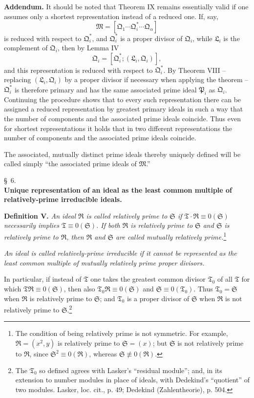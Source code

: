 \documentclass[11pt]{article}
\providecommand{\ideal}[1]{\mathfrak{#1}}
\begin{document}
\textbf{Addendum.} It should be noted that Theorem IX remains essentially valid if one assumes only a shortest representation instead of a reduced one. If, say,
\[
 \ideal M=[\ideal Q_1\cdots\ideal Q_i^*\cdots\ideal Q_\alpha]
\]
is reduced with respect to $\ideal Q_i^*$, and $\ideal Q_i^*$ is a proper divisor of $\ideal Q_i$, while $\ideal L_i$ is the complement of $\ideal Q_i$, then by Lemma IV
\[
 \ideal Q_i=[\ideal Q_i^*;(\ideal L_i,\ideal Q_i)],
\]
and this representation is reduced with respect to $\ideal Q_i^*$. By Theorem VIII -- replacing $(\ideal L_i,\ideal Q_i)$ by a proper divisor if necessary when applying the theorem -- $\ideal Q_i^*$ is therefore primary and has the same associated prime ideal $\ideal P_i$ as $\ideal Q_i$. Continuing the procedure shows that to every such representation there can be assigned a reduced representation by greatest primary ideals in such a way that the number of components and the associated prime ideals coincide. Thus even for shortest representations it holds that in two different representations the number of components and the associated prime ideals coincide.

The associated, mutually distinct prime ideals thereby uniquely defined will be called simply ``the associated prime ideals of $\ideal M$.''




\begin{center}
\S~6.\\[0.25em]
\textbf{Unique representation of an ideal as the least common multiple of relatively-prime irreducible ideals.}
\end{center}

\textbf{Definition V.} \emph{An ideal $\ideal R$ is called relatively prime to $\ideal S$ if $\ideal T\cdot\ideal R\equiv0(\ideal S)$ necessarily implies $\ideal T\equiv0(\ideal S)$. If both $\ideal R$ is relatively prime to $\ideal S$ and $\ideal S$ is relatively prime to $\ideal R$, then $\ideal R$ and $\ideal S$ are called mutually relatively prime.}\footnote{The condition of being relatively prime is not symmetric. For example, $\ideal R=(x^2,y)$ is relatively prime to $\ideal S=(x)$; but $\ideal S$ is not relatively prime to $\ideal R$, since $\ideal S^2\equiv0(\ideal R)$, whereas $\ideal S\not\equiv0(\ideal R)$.}

\emph{An ideal is called relatively-prime irreducible if it cannot be represented as the least common multiple of mutually relatively prime proper divisors.}

In particular, if instead of $\ideal T$ one takes the greatest common divisor $\ideal T_0$ of all $\ideal T$ for which $\ideal T\ideal R\equiv0(\ideal S)$, then also $\ideal T_0\ideal R\equiv0(\ideal S)$ and $\ideal S\equiv0(\ideal T_0)$. Thus $\ideal T_0=\ideal S$ when $\ideal R$ is relatively prime to $\ideal S$; and $\ideal T_0$ is a proper divisor of $\ideal S$ when $\ideal R$ is not relatively prime to $\ideal S$.\footnote{The $\ideal T_0$ so defined agrees with Lasker's ``residual module''; and, in its extension to number modules in place of ideals, with Dedekind's ``quotient'' of two modules. Lasker, loc. cit., p. 49; Dedekind (Zahlentheorie), p. 504.}
\end{document}
